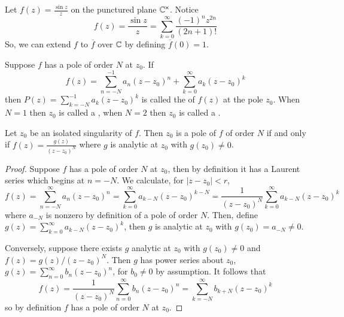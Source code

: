 \begin{example}
    Let $f(z) = \frac{\sin z}{z}$ on the punctured plane $\mathbb C^{\times}$. Notice \begin{equation*}
        f(z) = \frac{\sin z}{z} = \sum_{k=0}^{\infty}\frac{(-1)^nz^{2n}}{(2n+1)!}
    \end{equation*}
    So, we can extend $f$ to $\overline{f}$ over $\mathbb C$ by defining $\overline{f}(0) = 1$.
\end{example}

\begin{definition}
    Suppose $f$ has a pole of order $N$ at $z_0$. If \begin{equation*}
        f(z) = \sum_{n=-N}^{-1}a_n(z-z_0)^n + \sum_{k=0}^{\infty}a_k(z-z_0)^k
    \end{equation*}
    then $P(z) = \sum_{k=-N}^{-1}a_k(z-z_0)^k$ is called the  of $f(z)$ at the pole $z_0$. When $N = 1$ then $z_0$ is called a , when $N = 2$ then $z_0$ is called a .
\end{definition}


\begin{theorem}
    Let $z_0$ be an isolated singularity of $f$. Then $z_0$ is a pole of $f$ of order $N$ if and only if $f(z) = \frac{g(z)}{(z-z_0)^N}$ where $g$ is analytic at $z_0$ with $g(z_0) \neq 0$.
\end{theorem}
\begin{proof}
    Suppose $f$ has a pole of order $N$ at $z_0$, then by definition it has a Laurent series which begins at $n=-N$. We calculate, for $|z-z_0| < r$, \begin{equation*}
        f(z) = \sum_{n=-N}^{\infty}a_n(z-z_0)^n = \sum_{k=0}^{\infty}a_{k-N}(z-z_0)^{k-N} = \frac{1}{(z-z_0)^N}\sum_{k=0}^{\infty}a_{k-N}(z-z_0)^k
    \end{equation*}
    where $a_{-N}$ is nonzero by definition of a pole of order $N$. Then, define $g(z) = \sum_{k=0}^{\infty}a_{k-N}(z-z_0)^k$, then $g$ is analytic at $z_0$ with $g(z_0) = a_{-N} \neq 0$. 

    Conversely, suppose there exists $g$ analytic at $z_0$ with $g(z_0) \neq 0$ and $f(z) = g(z)/(z-z_0)^N$. Then $g$ has power series about $z_0$, $g(z) = \sum_{n=0}^{\infty}b_n(z-z_0)^n$, for $b_0 \neq 0$ by assumption. It follows that \begin{equation*}
        f(z) = \frac{1}{(z-z_0)^N}\sum_{n=0}^{\infty}b_n(z-z_0)^n = \sum_{k=-N}^{\infty}b_{k+N}(z-z_0)^k
    \end{equation*}
    so by definition $f$ has a pole of order $N$ at $z_0$.
\end{proof}

